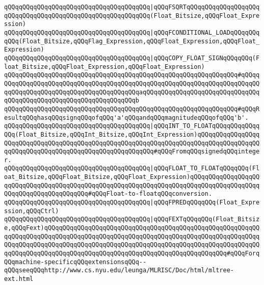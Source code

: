 \verb|qQQqqQQqqQQqqQQqqQQqqQQqqQQqqQQqqQQqqQQq|\verb#|qQQqFSQRTqQQqqQQqqQQqqQQqqQQqqQQqqQQqqQQqqQQqqQQqqQQqqQQqqQQqqQQqqQQq(Float_Bitsize,qQQqFloat_Expression)#\newline
\verb|qQQqqQQqqQQqqQQqqQQqqQQqqQQqqQQqqQQqqQQq|\verb#|qQQqFCONDITIONAL_LOADqQQqqQQqqQQq(Float_Bitsize,qQQqFlag_Expression,qQQqFloat_Expression,qQQqFloat_Expression)#\newline
\newline
\verb|qQQqqQQqqQQqqQQqqQQqqQQqqQQqqQQqqQQqqQQq|\verb#|qQQqCOPY_FLOAT_SIGNqQQqqQQq(Float_Bitsize,qQQqFloat_Expression,qQQqFloat_Expression)#\newline
\verb|qQQqqQQqqQQqqQQqqQQqqQQqqQQqqQQqqQQqqQQqqQQqqQQqqQQqqQQqqQQqqQQq#qQQqqQQqqQQqqQQqqQQqqQQqqQQqqQQqqQQqqQQqqQQqqQQqqQQqqQQqqQQqqQQqqQQqqQQqqQQqqQQqqQQqqQQqqQQqqQQqqQQqqQQqqQQqqQQqaqQQqqQQqqQQqqQQqqQQqqQQqqQQqqQQqqQQqqQQqqQQqqQQqqQQqqQQqqQQqqQQqqQQqb|\newline
\verb|qQQqqQQqqQQqqQQqqQQqqQQqqQQqqQQqqQQqqQQqqQQqqQQqqQQqqQQqqQQqqQQq#qQQqResultqQQqhasqQQqsignqQQqofqQQq'a'qQQqandqQQqmagnitudeqQQqofqQQq'b'.|\newline
\newline
\verb|qQQqqQQqqQQqqQQqqQQqqQQqqQQqqQQqqQQqqQQq|\verb#|qQQqINT_TO_FLOATqQQqqQQqqQQqqQQq(Float_Bitsize,qQQqInt_Bitsize,qQQqInt_Expression)qQQqqQQqqQQqqQQqqQQqqQQqqQQqqQQqqQQqqQQqqQQqqQQqqQQqqQQqqQQqqQQqqQQqqQQqqQQqqQQqqQQqqQQqqQQqqQQqqQQqqQQqqQQqqQQqqQQqqQQqqQQqqQQq#\verb|#qQQqFromqQQqsignedqQQqinteger.|\newline
\verb|qQQqqQQqqQQqqQQqqQQqqQQqqQQqqQQqqQQqqQQq|\verb#|qQQqFLOAT_TO_FLOATqQQqqQQq(Float_Bitsize,qQQqFloat_Bitsize,qQQqFloat_Expression)qQQqqQQqqQQqqQQqqQQqqQQqqQQqqQQqqQQqqQQqqQQqqQQqqQQqqQQqqQQqqQQqqQQqqQQqqQQqqQQqqQQqqQQqqQQqqQQqqQQqqQQqqQQqqQQq#\verb|#qQQqFloat-to-floatqQQqconversion.|\newline
\newline
\verb|qQQqqQQqqQQqqQQqqQQqqQQqqQQqqQQqqQQqqQQq|\verb#|qQQqFPREDqQQqqQQq(Float_Expression,qQQqCtrl)#\newline
\newline
\verb|qQQqqQQqqQQqqQQqqQQqqQQqqQQqqQQqqQQqqQQq|\verb#|qQQqFEXTqQQqqQQq(Float_Bitsize,qQQqFext)qQQqqQQqqQQqqQQqqQQqqQQqqQQqqQQqqQQqqQQqqQQqqQQqqQQqqQQqqQQqqQQqqQQqqQQqqQQqqQQqqQQqqQQqqQQqqQQqqQQqqQQqqQQqqQQqqQQqqQQqqQQqqQQqqQQqqQQqqQQqqQQqqQQqqQQqqQQqqQQqqQQqqQQqqQQqqQQqqQQqqQQqqQQqqQQqqQQqqQQqqQQqqQQqqQQqqQQqqQQqqQQqqQQqqQQqqQQqqQQqqQQqqQQqqQQqqQQqqQQq#\verb|#qQQqForqQQqmachine-specificqQQqextensionsqQQq--qQQqseeqQQqhttp://www.cs.nyu.edu/leunga/MLRISC/Doc/html/mltree-ext.html|\newline
